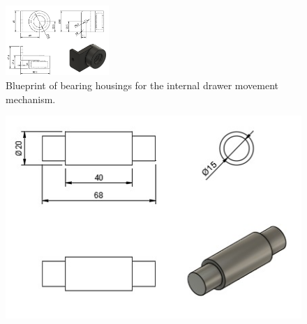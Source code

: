 \begin{figure}[H]
    \centering
    \includegraphics[width=0.35\textwidth]{PLANOS/PLANO_CHUMACERA.png}
    \caption{Blueprint of bearing housings for the internal drawer movement mechanism.}
    \label{fig:mecanismo_chumacera}
\end{figure}

\begin{figure}[H]
    \centering
    \includegraphics{pictures/PLANO_FLECHA.jpeg}
    \caption{}
    \label{fig:flecha}
\end{figure}